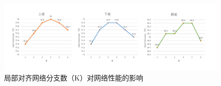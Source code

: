 \begin{figure}[h]
  \centering
  \includegraphics[width=1.0\linewidth]{Img/K.pdf}
  \caption{局部对齐网络分支数（K）对网络性能的影响}
  \label{fig:K}
\end{figure}
